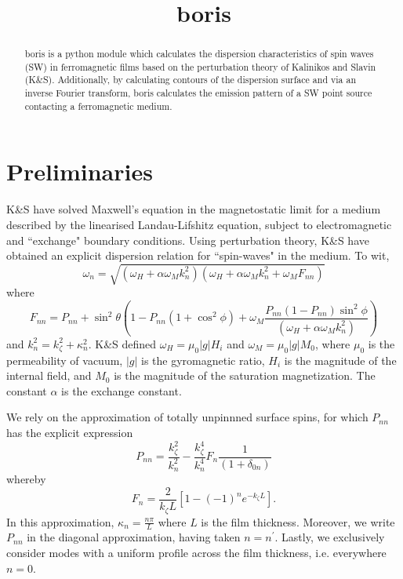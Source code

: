 \documentclass{article}
\title{boris}
\begin{document}
\maketitle
\begin{abstract}
boris is a python module which calculates the dispersion characteristics of spin waves (SW) in ferromagnetic films based on the perturbation theory of Kalinikos and Slavin (K\&{}S). Additionally, by calculating contours of the dispersion surface and via an inverse Fourier transform, boris calculates the emission pattern of a SW point source contacting a ferromagnetic medium. 
\end{abstract}
\section{Preliminaries}
K\&{}S \cite{K_1980, KS_1986} have solved Maxwell's equation in the magnetostatic limit for a medium described by the linearised Landau-Lifshitz equation, subject to electromagnetic and ``exchange" boundary conditions. Using perturbation theory, K\&{}S have obtained an explicit dispersion relation for ``spin-waves" in the medium. To wit,
\begin{equation}\label{dispersion_main}
\omega_{n} = \sqrt{(\omega_{H} + \alpha \omega_{M} k_{n}^2)(\omega_{H} + \alpha \omega_{M} k_{n}^2 + \omega_{M} F_{nn})}
\end{equation}
where
\begin{equation}
F_{nn} = P_{nn} + \sin^2{\theta} \left(1 - P_{nn} \left( 1 + \cos^2{\phi}\right) + \omega_{M} \frac{P_{nn}(1-P_{nn})\sin^2{\phi}}{(\omega_{H} + \alpha \omega_{M} k_{n}^2)} \right)
\end{equation}
and $k_{n}^2 = k_{\zeta}^2 + \kappa_{n}^2$. K\&{}S defined $\omega_{H} = \mu_{0} |g| H_{i}$ and $\omega_{M} = \mu_{0} |g| M_{0}$, where $\mu_{0}$ is the permeability of vacuum, $|g|$ is the gyromagnetic ratio, $H_{i}$ is the magnitude of the internal field, and $M_{0}$ is the magnitude of the saturation magnetization. The constant $\alpha$ is the exchange constant.

We rely on the approximation of totally unpinnned surface spins, for which $P_{nn}$ has the explicit expression
\begin{equation}
P_{nn} = \frac{k_{\zeta}^2}{k_{n}^2} - \frac{k_{\zeta}^4}{k_{n}^4} F_{n} \frac{1}{(1 + \delta_{0n})}
\end{equation}
whereby
\begin{equation}
F_{n} = \frac{2}{k_{\zeta}L} [1 - (-1)^n e^{-k_{\zeta}L}].
\end{equation}
In this approximation, $\kappa_{n} = \frac{n \pi}{L}$ where $L$ is the film thickness. 
Moreover, we write $P_{nn}$ in the diagonal approximation, having taken $n = n^{\prime}$. 
Lastly, we exclusively consider modes with a uniform profile across the film thickness, i.e. everywhere $n = 0$.
\end{document}
